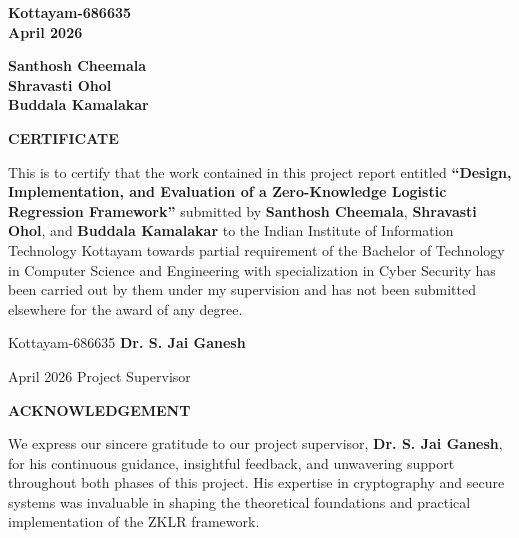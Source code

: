 \documentclass[12pt,a4wide]{report}
\begin{document}
\vspace*{4cm}

\begin{minipage}{0.45\textwidth}
    \raggedright
    \textbf{Kottayam-686635} \\[0.5cm]
    \textbf{April 2026}
\end{minipage}%
\hfill
\begin{minipage}{0.45\textwidth}
    \raggedleft
    \textbf{Santhosh Cheemala} \\[1cm]
    \textbf{Shravasti Ohol} \\[1cm]
    \textbf{Buddala Kamalakar}
\end{minipage}

\clearpage

\begin{center}
{\large\bf CERTIFICATE}
\end{center}

\noindent This is to certify that the work contained in this project report entitled \textbf{``Design, Implementation, and Evaluation of a Zero-Knowledge Logistic Regression Framework''} submitted by \textbf{Santhosh Cheemala}, \textbf{Shravasti Ohol}, and \textbf{Buddala Kamalakar} to the Indian Institute of Information Technology Kottayam towards partial requirement of the Bachelor of Technology in Computer Science and Engineering with specialization in Cyber Security has been carried out by them under my supervision and has not been submitted elsewhere for the award of any degree.

\vspace{4cm}

\noindent Kottayam-686635 \hfill \textbf{Dr. S. Jai Ganesh}

\noindent April 2026 \hfill Project Supervisor

\clearpage

\begin{center}
{\large\bf ACKNOWLEDGEMENT}
\end{center}

\noindent We express our sincere gratitude to our project supervisor, \textbf{Dr. S. Jai Ganesh}, for his continuous guidance, insightful feedback, and unwavering support throughout both phases of this project. His expertise in cryptography and secure systems was invaluable in shaping the theoretical foundations and practical implementation of the ZKLR framework.
\end{document}
